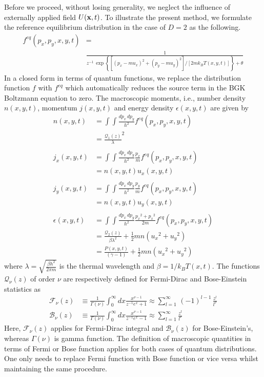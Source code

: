 \documentclass{rsproca}%
\begin{document}
Before we proceed, without losing generality, we neglect the influence of externally applied field \(U({\bf x},t)\). To illustrate the present method, we formulate the reference equilibrium distribution in the case of $D=2$ as the following.
\begin{align}
f^{eq}(p_x,p_y,x,y,t) &= \nonumber \\
&\frac{1}{z^{-1}\,\exp\left\{ \left[ (p_x-mu_x)^2 + (p_y-mu_y)^2 \right]/\left[2mk_BT(x,y,t)\right]\right\}+\theta}
\end{align}
In a closed form in terms of quantum functions, we replace the distribution function $f$ with $f^{eq}$ which automatically reduces the source term in the BGK Boltzmann equation to zero. The macroscopic moments, i.e., number density \(n(x,y,t)\), momentum \(j(x,y,t)\) and energy density \(\epsilon(x,y,t)\) are given by
\begin {align}
n(x,y,t) &= \int\int{\frac{dp_x\,dp_y}{h^2}f^{eq}(p_x,p_y,x,y,t)}\nonumber \\
&= \frac{\mathcal{Q}_{1}(z)}{\lambda}^2  \\
\nonumber \\
j_x(x,y,t) &= \int\int{\frac{dp_x\,dp_y}{h^2}\frac{p_x}{m}f^{eq}(p_x,p_y,x,y,t)}\nonumber \\
&= n(x,y,t)u_x(x,y,t)  \\
\nonumber \\
j_y(x,y,t) &= \int\int{\frac{dp_x\,dp_y}{h^2}\frac{p_y}{m}f^{eq}(p_x,p_y,x,y,t)}\nonumber \\
&= n(x,y,t)u_y(x,y,t)  \\
\nonumber \\
\epsilon(x,y,t) &= \int\int{\frac{dp_x\,dp_y}{h^2}\frac{{p_x}^2+{p_x}^2}{2m}f^{eq}(p_x,p_y,x,y,t)}\nonumber \\
&= \frac{\mathcal{Q}_{2}(z)}{\beta\lambda^2}+\frac{1}{2}mn({u_x}^2+{u_y}^2)\nonumber \\
&= \frac{P(x,y,t)}{(\gamma - 1)}+\frac{1}{2}mn({u_x}^2+{u_y}^2)
\end{align}
where \(\lambda=\sqrt{\frac{\beta h^2}{2\pi m}}\) is the thermal wavelength and \(\beta=1/k_{B} T(x,t)\).  The functions $\mathcal{Q}_{\nu}(z)$ of order $\nu$ are respectively defined for Fermi-Dirac and Bose-Einstein statistics as
\begin {align}
\mathcal{F}_{\nu}(z)&\equiv \frac{1}{\Gamma(\nu)} \int^{\infty}_{0}{dx\frac{x^{\nu -1}}{z^{-1}e^{x} +1}}\approx\sum^{\infty}_{l=1}\,(-1)^{l-1}\,{\frac{z^l}{l^\nu}}\\
\mathcal{B}_{\nu}(z)&\equiv \frac{1}{\Gamma(\nu)} \int^{\infty}_{0}{dx\frac{x^{\nu-1}}{z^{-1}e^{x}-1}}\approx\sum^{\infty}_{l=1}{\frac{z^l}{l^\nu}}
\end{align}
Here,  \(\mathcal{F}_{\nu}(z)\) applies for Fermi-Dirac integral and \(\mathcal{B}_{\nu}(z)\) for Bose-Einstein's, whereas \(\Gamma(\nu)\) is gamma function. The definition of macroscopic quantities in terms of Fermi or Bose function applies for both cases of quantum distributions. One only needs to replace Fermi function with Bose function or vice versa whilst maintaining the same procedure.
\end{document}
